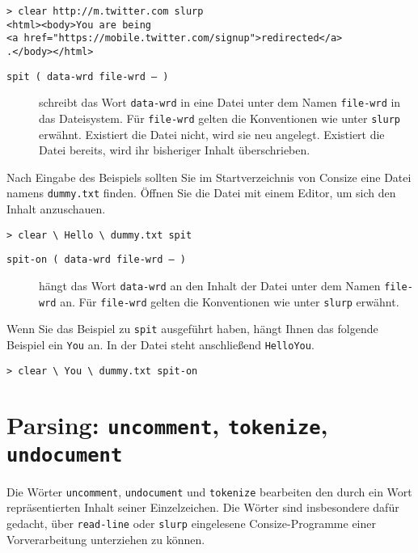 \begin{verbatim}
> clear http://m.twitter.com slurp
<html><body>You are being
<a href="https://mobile.twitter.com/signup">redirected</a>
.</body></html>
\end{verbatim}

\begin{description}
\item[\texttt{spit ( data-wrd file-wrd -- )}] schreibt das Wort \verb|data-wrd| in eine Datei unter dem Namen \verb|file-wrd| in das Dateisystem. Für \verb|file-wrd| gelten die Konventionen wie unter \verb|slurp| erwähnt. Existiert die Datei nicht, wird sie neu angelegt. Existiert die Datei bereits, wird ihr bisheriger Inhalt überschrieben.
\end{description}

Nach Eingabe des Beispiels sollten Sie im Startverzeichnis von Consize eine Datei namens \verb|dummy.txt| finden. Öffnen Sie die Datei mit einem Editor, um sich den Inhalt anzuschauen.

\begin{verbatim}
> clear \ Hello \ dummy.txt spit

\end{verbatim}

\begin{description}
\item[\texttt{spit-on ( data-wrd file-wrd -- )}] hängt das Wort \verb|data-wrd| an den Inhalt der Datei unter dem Namen \verb|file-wrd| an. Für \verb|file-wrd| gelten die Konventionen wie unter \verb|slurp| erwähnt.
\end{description}

Wenn Sie das Beispiel zu \verb|spit| ausgeführt haben, hängt Ihnen das folgende Beispiel ein \verb|You| an. In der Datei steht anschließend \verb|HelloYou|.

\begin{verbatim}
> clear \ You \ dummy.txt spit-on

\end{verbatim}

\section{Parsing: \texttt{uncomment}, \texttt{tokenize}, \texttt{undocument}}
\label{Sec:Parsing}

Die Wörter \verb|uncomment|, \verb|undocument| und \verb|tokenize| bearbeiten den durch ein Wort repräsentierten Inhalt seiner Einzelzeichen. Die Wörter sind insbesondere dafür gedacht, über \verb|read-line| oder \verb|slurp| eingelesene Consize-Programme einer Vorverarbeitung unterziehen zu können.

